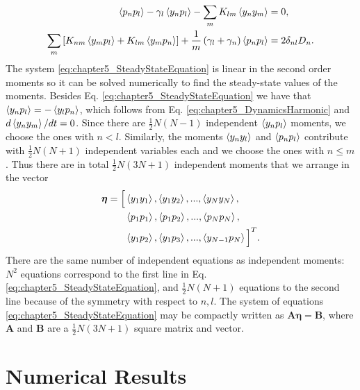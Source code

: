 %
\begin{equation}
    \begin{split}
        \expval{p_n p_l} - \gamma_l\expval{y_n p_l} - \sum_m K_{lm}\expval{y_n y_m} &= 0,\\
        \sum_{m}\left[ K_{nm}\expval{y_m p_l} + K_{lm}\expval{y_m p_n} \right] + \frac{1}{m}\left( \gamma_l + \gamma_n \right)\expval{p_n p_l} &= 2 \delta_{nl} D_n.
    \end{split}
    \label{eq:chapter5_SteadyStateEquation}
\end{equation}
%
The system \eqref{eq:chapter5_SteadyStateEquation} is linear in the second order moments so it can be solved numerically to find the steady-state values of the moments. Besides Eq. \eqref{eq:chapter5_SteadyStateEquation} we have that $\expval{y_n p_l} = - \expval{y_l p_n}$, which follows from Eq. \eqref{eq:chapter5_DynamicsHarmonic} and $d\expval{y_n y_m}/dt = 0$. Since there are $\frac{1}{2}N(N-1)$ independent $\expval{y_n p_l}$ moments, we choose the ones with $n<l$. Similarly, the moments $\expval{y_n y_l}$ and $\expval{p_n p_l}$ contribute with $\frac{1}{2}N(N+1)$ independent variables each and we choose the ones with $n\leq m$. Thus there are in total $\frac{1}{2}N(3N+1)$ independent moments that we arrange in the vector
%
\begin{equation}
\begin{split}
    \bm\eta = \Big[ &\expval{y_1 y_1},\expval{y_1 y_2},...,\expval{y_N y_N},\\
    &\expval{p_1 p_1},\expval{p_1 p_2},...,\expval{p_N p_N},\\
    &\expval{y_1 p_2},\expval{y_1 p_3},...,\expval{y_{N-1} p_N}\Big]^T.
    \label{eq:chapter5_CovariancesVector}
\end{split}
\end{equation}
%
There are the same number of independent equations
as independent moments: $N^2$
equations correspond to the first line in Eq.  \eqref{eq:chapter5_SteadyStateEquation}, and $\frac{1}{2}N(N+1)$ equations
to the second line because of the symmetry with respect to $n,l$. The system of equations \eqref{eq:chapter5_SteadyStateEquation} may be compactly written as $\mathbf{A}\boldsymbol\eta = \mathbf{B}$, where $\mathbf{A}$ and $\mathbf{B}$ are a $\frac{1}{2}N(3N+1)$ square matrix and vector.

\section{Numerical Results\label{sec:chapter5_NumericalResults}}


